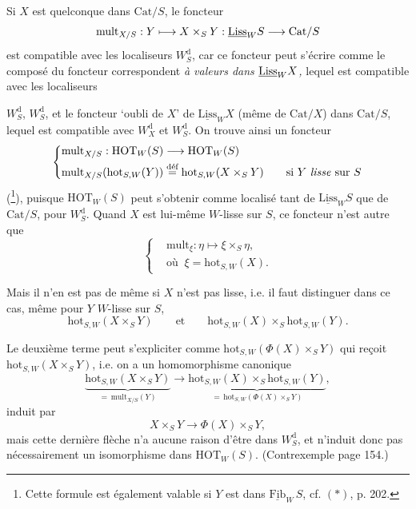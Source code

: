 Si $X$ est quelconque dans $\mathrm{Cat}/S$, le foncteur
\[
\mathrm{mult}_{X/S} : Y \longmapsto X \times_S Y : \underline{\mathrm{Liss}}_W S \longrightarrow \mathrm{Cat}/S
\]
est compatible avec les localiseurs $W_S^{\mathrm{d}}$, car ce foncteur peut s'écrire comme le composé du foncteur correspondent \textit{à valeurs dans $\underline{\mathrm{Liss}}_W X$,} lequel est compatible avec les localiseurs %

\setcounter{footnote}{97}


$W_S^{\mathrm{d}}$, $W_S^{\mathrm{d}}$, et le foncteur ‘oubli de $X$’ de $\underline{\mathrm{Liss}}_W X$ (même de $\mathrm{Cat}/X$) dans $\mathrm{Cat}/S$, lequel est compatible avec $W_X^{\mathrm{d}}$ et $W_S^{\mathrm{d}}$. On trouve ainsi un foncteur %
\[
\left\{\begin{aligned}
&\mathrm{mult}_{X/S} : \mathrm{HOT}_W(S) \longrightarrow \mathrm{HOT}_W(S)\\
&\mathrm{mult}_{X/S}(\mathrm{hot}_{S,W}(Y)) \overset{\text{déf}}{=} \mathrm{hot}_{S,W}(X\times_S Y) \qquad \text{si $Y$ \textit{lisse} sur $S$}
\end{aligned}\right.
\]
(\footnote{Cette formule est également valable si $Y$ est dans $\underline{\mathrm{Fib}}_W\, S$, cf. $(*)$, p. 202.}), puisque $\mathrm{HOT}_W(S)$ peut s'obtenir comme localisé tant de $\underline{\mathrm{Liss}}_W S$ que de $\mathrm{Cat}/S$, pour $W_S^{\mathrm{d}}$. Quand $X$ est lui-même $W$-lisse sur $S$, ce foncteur n'est autre que
\[
\left\{\begin{aligned}
&\mathrm{mult}_\xi : \eta \longmapsto \xi\times_S \eta,\\
&\text{où }\ \xi = \mathrm{hot}_{S,W}(X).
\end{aligned}\right.
\]

Mais il n'en est pas de même si $X$ n'est pas lisse, i.e. il faut distinguer dans ce cas, même pour $Y$ $W$-lisse sur $S$,
\[
\mathrm{hot}_{S,W}(X\times_S Y) \qquad\text{et}\qquad \mathrm{hot}_{S,W}(X)\times_S \mathrm{hot}_{S,W}(Y).
\]

Le deuxième terme peut s'expliciter comme $\mathrm{hot}_{S,W}(\Phi(X)\times_S Y)$ qui reçoit $\mathrm{hot}_{S,W}(X\times_S Y)$, i.e.
on a un homomorphisme canonique
\[
\underbrace{\mathrm{hot}_{S,W}(X\times_S Y)}_{=\,\mathrm{mult}_{X/S}(Y)} \longrightarrow \underbrace{\mathrm{hot}_{S,W}(X)\times_S \mathrm{hot}_{S,W}(Y)}_{=\,\mathrm{hot}_{S,W}(\Phi(X)\times_S Y)},
\]
induit par
\[
X\times_S Y \longrightarrow \Phi(X)\times_S Y,
\]
mais cette dernière flèche n'a aucune raison d'être dans $W_S^{\mathrm{d}}$, et n'induit donc pas nécessairement un isomorphisme dans $\mathrm{HOT}_W(S)$. (Contrexemple page 154.)

